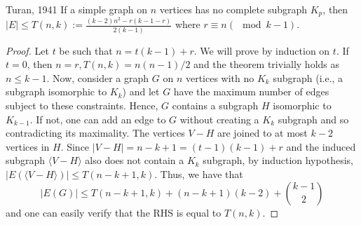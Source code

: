 \documentclass[../basic_graph_theory.tex]{subfiles}
\begin{document}
\begin{Thm}{Turan, 1941}{}
    If a simple graph on $n$ vertices has no complete subgraph $K_p$, then $|E| \leq T(n,k) := \frac{(k-2)n^2 - r(k-1-r)}{2(k-1)}$ where $r \equiv n(\mod k-1)$. 
\end{Thm}
\begin{proof}
    Let $t$ be such that $n = t(k-1) + r$.  We will prove by induction on $t$. If $t = 0$, then $n  = r, T(n,k) = n(n-1)/2$ and the theorem trivially holds as $n \leq k - 1$.  Now, consider a graph $G$ on $n$ vertices with no $K_k$ subgraph (i.e., a subgraph isomorphic to $K_k$) and let $G$ have the maximum number of edges subject to these constraints. Hence, $G$ contains a subgraph $H$ isomorphic to $K_{k-1}$. If not, one can add an edge to $G$ without creating a $K_k$ subgraph and so contradicting its maximality. The vertices $V - H$ are joined to at most $k-2$ vertices in $H$. Since $|V - H| = n - k +1 = (t-1)(k-1) + r$ and the induced subgraph $\langle V - H\rangle$ also does not contain a $K_k$ subgraph, by induction hypothesis, $|E(\langle V-H\rangle)| \leq T(n-k+1,k)$. Thus, we have that
    $$ |E(G)| \leq T(n-k+1,k) + (n-k+1)(k-2) + \binom{k-1}{2}$$
    and one can easily verify that the RHS is equal to $T(n,k)$. 
\end{proof}
\end{document}
